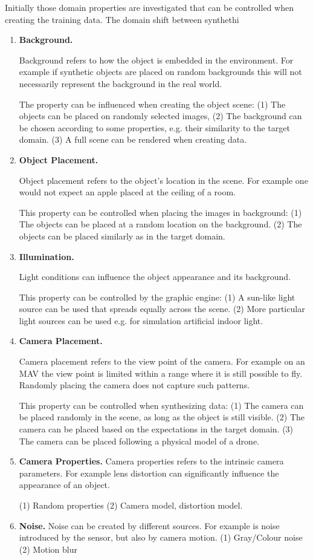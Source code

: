 Initially those domain properties are investigated that can be controlled when creating the training data. The domain shift between synthethi
\begin{enumerate}
	\item \textbf{Background.} 
	
	Background refers to how the object is embedded in the environment. For example if synthetic objects are placed on random backgrounds this will not necessarily represent the background in the real world.
	
	The property can be influenced when creating the object scene: (1) The objects can be placed on randomly selected images, (2) The background can be chosen according to some properties, e.g. their similarity to the target domain. (3) A full scene can be rendered when creating data.
	
	\item \textbf{Object Placement.} 
	
	Object placement refers to the object's location in the scene. For example one would not expect an apple placed at the ceiling of a room.
	
	This property can be controlled when placing the images in background: (1) The objects can be placed at a random location on the background. (2) The objects can be placed similarly as in the target domain.
	
	\item \textbf{Illumination.} 
	
	Light conditions can influence the object appearance and its background.
	
	This property can be controlled by the graphic engine: (1) A sun-like light source can be used that spreads equally across the scene. (2) More particular light sources can be used e.g. for simulation artificial indoor light.
	
	
	\item \textbf{Camera Placement.} 
	
	Camera placement refers to the view point of the camera. For example on an \ac{MAV} the view point is limited within a range where it is still possible to fly. Randomly placing the camera does not capture such patterns.
	
	This property can be controlled when synthesizing data: (1) The camera can be placed randomly in the scene, as long as the object is still visible. (2) The camera can be placed based on the expectations in the target domain. (3) The camera can be placed following a physical model of a drone.
	
	\item \textbf{Camera Properties.} Camera properties refers to the intrinsic camera parameters. For example lens distortion can significantly influence the appearance of an object.
	
	(1) Random properties (2) Camera model, distortion model.
	
	\item \textbf{Noise.} Noise can be created by different sources. For example is noise introduced by the sensor, but also by camera motion.
	(1) Gray/Colour noise (2) Motion blur
	
\end{enumerate}

